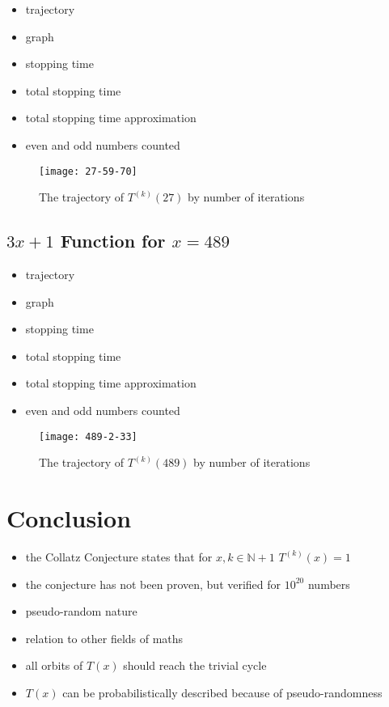 \documentclass[12pt,a4paper,reqno]{amsart}
\begin{document}
\begin{itemize}
    \item trajectory
    \item graph
    \item stopping time
    \item total stopping time
    \item total stopping time approximation
    \item even and odd numbers counted
\end{itemize}

\begin{figure}[h]
\texttt{[image: 27-59-70]}
    \caption{The trajectory of $T^{(k)}(27)$ by number of iterations}
\label{fig:02}
\end{figure}

\subsection{$3x+1$ Function for $x=489$}

\begin{itemize}
    \item trajectory
    \item graph
    \item stopping time
    \item total stopping time
    \item total stopping time approximation
    \item even and odd numbers counted
\end{itemize}

\begin{figure}[h]
\texttt{[image: 489-2-33]}
    \caption{The trajectory of $T^{(k)}(489)$ by number of iterations}
\label{fig:03}
\end{figure}


\section{Conclusion}

\begin{itemize}
    \item the Collatz Conjecture states that for $x,k \in \mathbb{N} + 1$
        $T^{(k)}(x)=1$
    \item the conjecture has not been proven, but verified for $10^{20}$
        numbers
    \item pseudo-random nature
    \item relation to other fields of maths
    \item all orbits of $T(x)$ should reach the trivial cycle
    \item $T(x)$ can be probabilistically described because of pseudo-randomness
\end{itemize}
\end{document}
